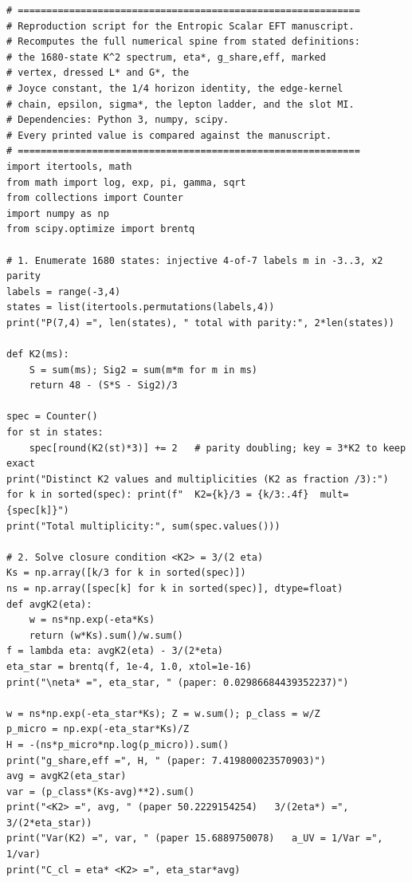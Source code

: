 \documentclass[11pt]{article}
\begin{document}
{\footnotesize\begin{verbatim}
# ============================================================
# Reproduction script for the Entropic Scalar EFT manuscript.
# Recomputes the full numerical spine from stated definitions:
# the 1680-state K^2 spectrum, eta*, g_share,eff, marked
# vertex, dressed L* and G*, the
# Joyce constant, the 1/4 horizon identity, the edge-kernel
# chain, epsilon, sigma*, the lepton ladder, and the slot MI.
# Dependencies: Python 3, numpy, scipy.
# Every printed value is compared against the manuscript.
# ============================================================
import itertools, math
from math import log, exp, pi, gamma, sqrt
from collections import Counter
import numpy as np
from scipy.optimize import brentq

# 1. Enumerate 1680 states: injective 4-of-7 labels m in -3..3, x2 parity
labels = range(-3,4)
states = list(itertools.permutations(labels,4))
print("P(7,4) =", len(states), " total with parity:", 2*len(states))

def K2(ms):
    S = sum(ms); Sig2 = sum(m*m for m in ms)
    return 48 - (S*S - Sig2)/3

spec = Counter()
for st in states:
    spec[round(K2(st)*3)] += 2   # parity doubling; key = 3*K2 to keep exact
print("Distinct K2 values and multiplicities (K2 as fraction /3):")
for k in sorted(spec): print(f"  K2={k}/3 = {k/3:.4f}  mult={spec[k]}")
print("Total multiplicity:", sum(spec.values()))

# 2. Solve closure condition <K2> = 3/(2 eta)
Ks = np.array([k/3 for k in sorted(spec)])
ns = np.array([spec[k] for k in sorted(spec)], dtype=float)
def avgK2(eta):
    w = ns*np.exp(-eta*Ks)
    return (w*Ks).sum()/w.sum()
f = lambda eta: avgK2(eta) - 3/(2*eta)
eta_star = brentq(f, 1e-4, 1.0, xtol=1e-16)
print("\neta* =", eta_star, " (paper: 0.02986684439352237)")

w = ns*np.exp(-eta_star*Ks); Z = w.sum(); p_class = w/Z
p_micro = np.exp(-eta_star*Ks)/Z
H = -(ns*p_micro*np.log(p_micro)).sum()
print("g_share,eff =", H, " (paper: 7.419800023570903)")
avg = avgK2(eta_star)
var = (p_class*(Ks-avg)**2).sum()
print("<K2> =", avg, " (paper 50.2229154254)   3/(2eta*) =", 3/(2*eta_star))
print("Var(K2) =", var, " (paper 15.6889750078)   a_UV = 1/Var =", 1/var)
print("C_cl = eta* <K2> =", eta_star*avg)


\end{verbatim}}
\end{document}
